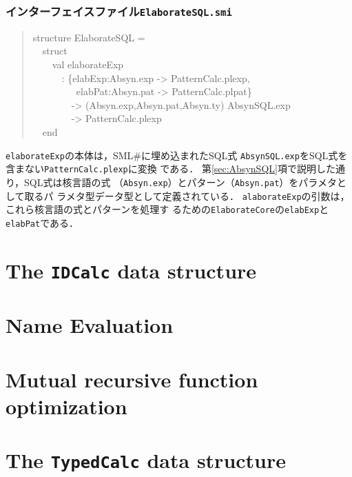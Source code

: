\documentclass{jbook}
\newcommand{\txt}[2]{#2}
\newcommand{\smlsharp}{SML\#}
\newcommand{\code}[1]{\mbox{\large\tt #1}}
\newcommand{\myem}{\mbox{\ \ }}
\newenvironment{program}{\begin{quote}\begin{tt}}%
                        {\end{tt}\end{quote}}
\begin{document}
\subsection{インターフェイスファイル\code{ElaborateSQL.smi}}
\begin{program}
structure ElaborateSQL =\\
\myem  struct\\
\myem\myem     val elaborateExp\\
\myem\myem\myem   : \{elabExp:Absyn.exp -> PatternCalc.plexp,\\
\myem\myem\myem\myem\  elabPat:Absyn.pat -> PatternCalc.plpat\}\\
\myem\myem\myem\myem  -> (Absyn.exp,Absyn.pat,Absyn.ty) AbsynSQL.exp\\
\myem\myem\myem\myem  -> PatternCalc.plexp\\
\myem  end
\end{program}
	\code{elaborateExp}の本体は，\smlsharp{}に埋め込まれたSQL式
\code{AbsynSQL.exp}をSQL式を含まない\code{PatternCalc.plexp}に変換
である．
	第\ref{sec:AbsynSQL}項で説明した通り，SQL式は核言語の式
（\code{Absyn.exp}）とパターン（\code{Absyn.pat}）をパラメタとして取るパ
ラメタ型データ型として定義されている．
	\code{alaborateExp}の引数は，これら核言語の式とパターンを処理す
るための\code{ElaborateCore}の\code{elabExp}と\code{elabPat}である．


\else%
\fi%


% 
\chapter{\txt
{\code{IDCalc}データ構造}
{The \code{IDCalc} data structure}
}
\label{chap:IDCalc}

\chapter{\txt
{名前解析処理}
{Name Evaluation}
}
\label{chap:nameevaluation}

\chapter{\txt
{相互再帰関数最適化}
{Mutual recursive function optimization}
}
\label{chap:valrecoptimize}

\chapter{\txt
{\code{TypedCalc}データ構造}
{The \code{TypedCalc} data structure}
}
\label{chap:TypedCalc}
\end{document}
